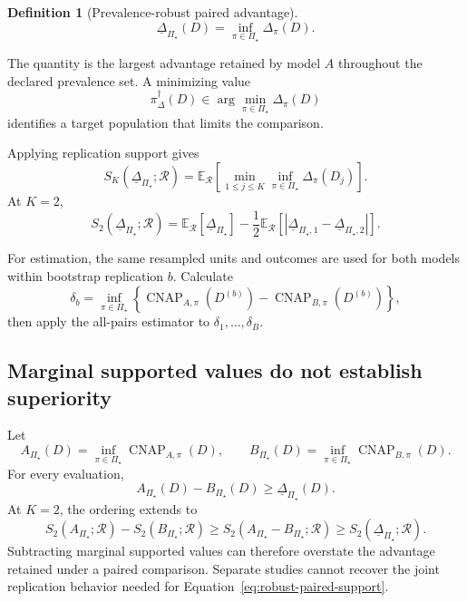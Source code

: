 \documentclass[11pt]{article}
\newcommand{\CNAP}{\operatorname{CNAP}}
\newcommand{\Regime}{\mathcal{R}}
\newcommand{\PSet}{\Pi_\star}
\newcommand{\E}{\mathbb{E}}
\newcommand{\RobDelta}{\underline{\Delta}_{\PSet}}
\newtheorem{definition}{Definition}
\theoremstyle{remark}
\begin{document}
\begin{definition}[Prevalence-robust paired advantage]
\begin{equation}
\RobDelta(D)
=
\inf_{\pi\in\PSet}
\Delta_\pi(D).
\label{eq:robust-paired-effect}
\end{equation}
\end{definition}

The quantity is the largest advantage retained by model $A$ throughout the declared prevalence set. A minimizing value
\[
\pi_\Delta^\dagger(D)
\in
\arg\min_{\pi\in\PSet}\Delta_\pi(D)
\]
identifies a target population that limits the comparison.

Applying replication support gives
\begin{equation}
S_K(\RobDelta;\Regime)
=
\E_{\Regime}
\left[
\min_{1\leq j\leq K}
\inf_{\pi\in\PSet}
\Delta_\pi(D_j)
\right].
\label{eq:robust-paired-support}
\end{equation}
At $K=2$,
\begin{equation}
S_2(\RobDelta;\Regime)
=
\E_{\Regime}[\RobDelta]
-
\frac12
\E_{\Regime}
\left[
|\underline{\Delta}_{\PSet,1}-\underline{\Delta}_{\PSet,2}|
\right].
\label{eq:robust-paired-k2}
\end{equation}

For estimation, the same resampled units and outcomes are used for both models within bootstrap replication $b$. Calculate
\[
\delta_b
=
\inf_{\pi\in\PSet}
\left\{
\CNAP_{A,\pi}(D^{(b)})
-
\CNAP_{B,\pi}(D^{(b)})
\right\},
\]
then apply the all-pairs estimator to $\delta_1,\ldots,\delta_B$.

\subsection{Marginal supported values do not establish superiority}

Let
\[
A_{\PSet}(D)
=
\inf_{\pi\in\PSet}\CNAP_{A,\pi}(D),
\qquad
B_{\PSet}(D)
=
\inf_{\pi\in\PSet}\CNAP_{B,\pi}(D).
\]
For every evaluation,
\[
A_{\PSet}(D)-B_{\PSet}(D)
\geq
\RobDelta(D).
\]
At $K=2$, the ordering extends to
\begin{equation}
S_2(A_{\PSet};\Regime)
-
S_2(B_{\PSet};\Regime)
\geq
S_2(A_{\PSet}-B_{\PSet};\Regime)
\geq
S_2(\RobDelta;\Regime).
\label{eq:robust-marginal-order}
\end{equation}
Subtracting marginal supported values can therefore overstate the advantage retained under a paired comparison. Separate studies cannot recover the joint replication behavior needed for Equation~\eqref{eq:robust-paired-support}.
\end{document}

